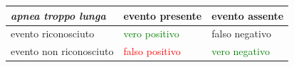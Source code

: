 \begin{frame}
\begin{itemize}
 \begin{center}
     \begin{tabular}{|l|ll|}
       \hline
       \emph{apnea troppo lunga} & evento presente & evento assente \\
       \hline
       evento riconosciuto        & \textcolor{green}{vero positivo}   & falso negativo \\
       evento non riconosciuto    & \textcolor{red}{falso positivo}  & \textcolor{green}{vero negativo}  \\
       \hline
     \end{tabular}
\end{center}
\end{itemize}
% 
% 
% 
% 
% 
% 
% 

\end{frame}
